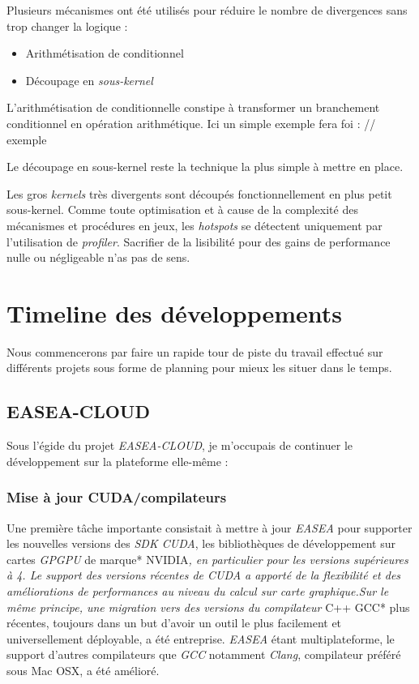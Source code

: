 \documentclass[french, 11pt]{memoir}
\begin{document}
Plusieurs mécanismes ont été utilisés pour réduire le nombre de
divergences sans trop changer la logique :

\begin{itemize}
	\item
	Arithmétisation de conditionnel
	\item
	Découpage en \emph{sous-kernel}
\end{itemize}

L'arithmétisation de conditionnelle constipe à transformer un
branchement conditionnel en opération arithmétique. Ici un simple
exemple fera foi : // exemple

Le découpage en sous-kernel reste la technique la plus simple à mettre
en place.

Les gros \emph{kernels} très divergents sont découpés fonctionnellement
en plus petit sous-kernel. Comme toute optimisation et à cause de la
complexité des mécanismes et procédures en jeux, les \emph{hotspots} se
détectent uniquement par l'utilisation de \emph{profiler}. Sacrifier de
la lisibilité pour des gains de performance nulle ou négligeable n'as
pas de sens.

\section{Timeline des
	développements}\label{timeline-des-duxe9veloppements}

Nous commencerons par faire un rapide tour de piste du travail effectué
sur différents projets sous forme de planning pour mieux les situer dans
le temps.

\subsection{EASEA-CLOUD}\label{easea-cloud-1}

Sous l'égide du projet \emph{EASEA-CLOUD}, je m'occupais de continuer le
développement sur la plateforme elle-même :

\subsubsection{Mise à jour
	CUDA/compilateurs}\label{mise-uxe0-jour-cudacompilateurs}

Une première tâche importante consistait à mettre à jour \emph{EASEA}
pour supporter les nouvelles versions des \emph{SDK CUDA}, les
bibliothèques de développement sur cartes \emph{GPGPU} de marque*
NVIDIA\emph{, en particulier pour les versions supérieures à 4. Le
	support des versions récentes de CUDA a apporté de la flexibilité et des
	améliorations de performances au niveau du calcul sur carte
	graphique.Sur le même principe, une migration vers des versions du
	compilateur }C++ GCC* plus récentes, toujours dans un but d'avoir un
outil le plus facilement et universellement déployable, a été
entreprise. \emph{EASEA} étant multiplateforme, le support d'autres
compilateurs que \emph{GCC} notamment \emph{Clang}, compilateur préféré
sous Mac OSX, a été amélioré.
\end{document}
